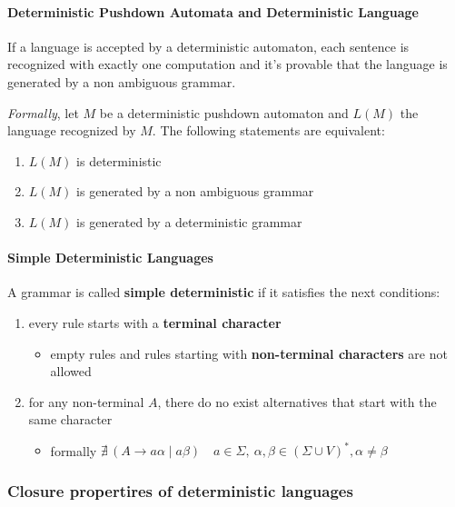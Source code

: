 \documentclass[english]{article}
\begin{document}
\paragraph{Deterministic Pushdown Automata and Deterministic Language}

If a language is accepted by a deterministic automaton, each sentence is recognized with exactly one computation and it's provable that the language is generated by a non ambiguous grammar.

\bigskip
\textit{Formally}, let \(M\) be a deterministic pushdown automaton and \(L(M)\) the language recognized by \(M\).
The following statements are equivalent:

\begin{enumerate}
  \item \(L(M)\) is deterministic
  \item \(L(M)\) is generated by a non ambiguous grammar
  \item \(L(M)\) is generated by a deterministic grammar
\end{enumerate}

\paragraph{Simple Deterministic Languages}

A grammar is called \textbf{simple deterministic} if it satisfies the next conditions:

\begin{enumerate}
  \item every rule \RP starts with a \textbf{terminal character}
        \begin{itemize}
          \item empty rules and rules starting with \textbf{non-terminal characters} are not allowed
        \end{itemize}
  \item for any non-terminal \(A\), there do no exist alternatives that start with the same character
        \begin{itemize}
          \item formally \(\nexists \, \left( A \rightarrow a \alpha \mid a \beta \right) \quad a \in \Sigma, \ \alpha, \beta \in \left( \Sigma \cup V \right)^\ast, \alpha \neq \beta\)
        \end{itemize}
\end{enumerate}

\subsubsection{Closure propertires of deterministic \CF languages}
\end{document}
